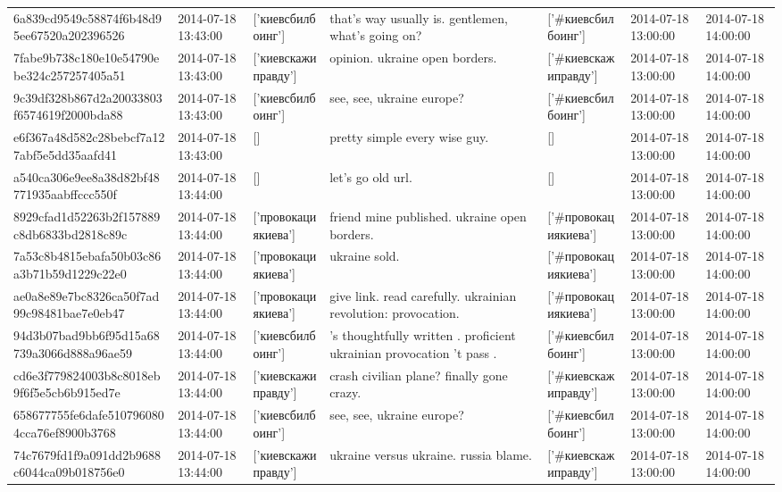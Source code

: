 \begin{tabular}{lllllll}
6a839cd9549c58874f6b48d95ee67520a202396526 & 2014-07-18 13:43:00 & ['киевсбилбоинг'] & that's way usually is. gentlemen, what's going on? & ['#киевсбилбоинг'] & 2014-07-18 13:00:00 & 2014-07-18 14:00:00 \\
7fabe9b738c180e10e54790ebe324c257257405a51 & 2014-07-18 13:43:00 & ['киевскажиправду'] & opinion. ukraine open borders. & ['#киевскажиправду'] & 2014-07-18 13:00:00 & 2014-07-18 14:00:00 \\
9c39df328b867d2a20033803f6574619f2000bda88 & 2014-07-18 13:43:00 & ['киевсбилбоинг'] & see, see, ukraine europe? & ['#киевсбилбоинг'] & 2014-07-18 13:00:00 & 2014-07-18 14:00:00 \\
e6f367a48d582c28bebcf7a127abf5e5dd35aafd41 & 2014-07-18 13:43:00 & [] & pretty simple every wise guy. & [] & 2014-07-18 13:00:00 & 2014-07-18 14:00:00 \\
a540ca306e9ee8a38d82bf48771935aabffccc550f & 2014-07-18 13:44:00 & [] & let's go old url. & [] & 2014-07-18 13:00:00 & 2014-07-18 14:00:00 \\
8929cfad1d52263b2f157889c8db6833bd2818c89c & 2014-07-18 13:44:00 & ['провокациякиева'] & friend mine published. ukraine open borders. & ['#провокациякиева'] & 2014-07-18 13:00:00 & 2014-07-18 14:00:00 \\
7a53c8b4815ebafa50b03c86a3b71b59d1229c22e0 & 2014-07-18 13:44:00 & ['провокациякиева'] & ukraine sold. & ['#провокациякиева'] & 2014-07-18 13:00:00 & 2014-07-18 14:00:00 \\
ae0a8e89e7bc8326ca50f7ad99c98481bae7e0eb47 & 2014-07-18 13:44:00 & ['провокациякиева'] & give link. read carefully. ukrainian revolution: provocation. & ['#провокациякиева'] & 2014-07-18 13:00:00 & 2014-07-18 14:00:00 \\
94d3b07bad9bb6f95d15a68739a3066d888a96ae59 & 2014-07-18 13:44:00 & ['киевсбилбоинг'] & 's thoughtfully written . proficient ukrainian provocation 't pass . & ['#киевсбилбоинг'] & 2014-07-18 13:00:00 & 2014-07-18 14:00:00 \\
cd6e3f779824003b8c8018eb9f6f5e5cb6b915ed7e & 2014-07-18 13:44:00 & ['киевскажиправду'] & crash civilian plane? finally gone crazy. & ['#киевскажиправду'] & 2014-07-18 13:00:00 & 2014-07-18 14:00:00 \\
658677755fe6dafe5107960804cca76ef8900b3768 & 2014-07-18 13:44:00 & ['киевсбилбоинг'] & see, see, ukraine europe? & ['#киевсбилбоинг'] & 2014-07-18 13:00:00 & 2014-07-18 14:00:00 \\
74c7679fd1f9a091dd2b9688c6044ca09b018756e0 & 2014-07-18 13:44:00 & ['киевскажиправду'] & ukraine versus ukraine. russia blame. & ['#киевскажиправду'] & 2014-07-18 13:00:00 & 2014-07-18 14:00:00 \\

\end{tabular}
